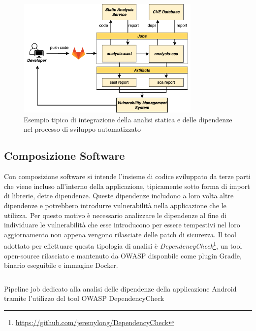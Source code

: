 \begin{figure}[H]
\centering
\includegraphics[width=0.8\textwidth]{img/tesi-12-sastsca.drawio.png}
\caption{Esempio tipico di integrazione della analisi statica e delle dipendenze nel processo di sviluppo automatizzato}
\end{figure}

\subsection{Composizione Software}
Con composizione software si intende l'insieme di codice sviluppato da terze parti che viene incluso all'interno della applicazione, tipicamente sotto forma di import di librerie, dette dipendenze. Queste dipendenze includono a loro volta altre dipendenze e potrebbero introdurre vulnerabilità nella applicazione che le utilizza. Per questo motivo è necessario analizzare le dipendenze al fine di individuare le vulnerabilità che esse introducono per essere tempestivi nel loro aggiornamento non appena vengono rilasciate delle patch di sicurezza. Il tool adottato per effettuare questa tipologia di analisi è \textit{DependencyCheck}\footnote{\url{https://github.com/jeremylong/DependencyCheck}}, un tool open-source rilasciato e mantenuto da OWASP disponbile come plugin Gradle, binario eseguibile e immagine Docker.

\begin{listing}[H]
\inputminted{yaml}{code/4-depcheckjob}
\caption{Pipeline job dedicato alla analisi delle dipendenze della applicazione Android tramite l'utilizzo del tool OWASP DependencyCheck}
\end{listing}

